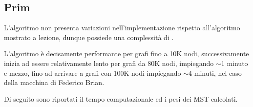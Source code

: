\subsection{Prim}
L'algoritmo non presenta variazioni nell'implementazione rispetto all'algoritmo mostrato a lezione, dunque possiede una complessità di .

L'algoritmo è decisamente performante per grafi fino a 10K nodi, successivamente inizia ad essere relativamente lento per grafi da 80K nodi, impiegando $\sim$1 minuto e mezzo, fino ad arrivare a grafi con 100K nodi impiegando $\sim$4 minuti, nel caso della macchina di Federico Brian.\acapo

Di seguito sono riportati il tempo computazionale ed i pesi dei MST calcolati.

